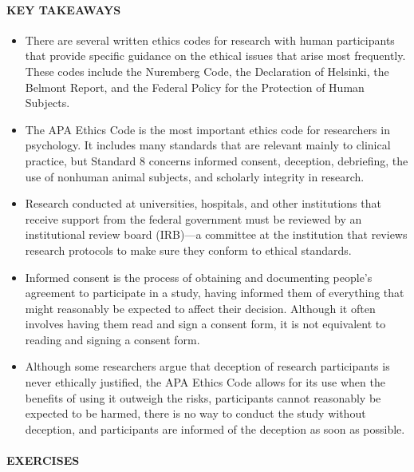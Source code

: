 \documentclass[
]{krantz}
\providecommand{\tightlist}{%
  \setlength{\itemsep}{0pt}\setlength{\parskip}{0pt}}
\begin{document}
\paragraph*{KEY TAKEAWAYS}\label{key-takeaways-23}

\begin{itemize}
\tightlist
\item
  There are several written ethics codes for research with human participants that provide specific guidance on the ethical issues that arise most frequently. These codes include the Nuremberg Code, the Declaration of Helsinki, the Belmont Report, and the Federal Policy for the Protection of Human Subjects.
\item
  The APA Ethics Code is the most important ethics code for researchers in psychology. It includes many standards that are relevant mainly to clinical practice, but Standard 8 concerns informed consent, deception, debriefing, the use of nonhuman animal subjects, and scholarly integrity in research.
\item
  Research conducted at universities, hospitals, and other institutions that receive support from the federal government must be reviewed by an institutional review board (IRB)---a committee at the institution that reviews research protocols to make sure they conform to ethical standards.
\item
  Informed consent is the process of obtaining and documenting people's agreement to participate in a study, having informed them of everything that might reasonably be expected to affect their decision. Although it often involves having them read and sign a consent form, it is not equivalent to reading and signing a consent form.
\item
  Although some researchers argue that deception of research participants is never ethically justified, the APA Ethics Code allows for its use when the benefits of using it outweigh the risks, participants cannot reasonably be expected to be harmed, there is no way to conduct the study without deception, and participants are informed of the deception as soon as possible.
\end{itemize}

\paragraph*{EXERCISES}\label{exercises-19}
\end{document}
